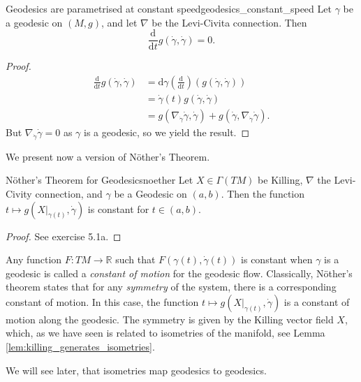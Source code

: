 \begin{colorlem}{Geodesics are parametrised at constant speed}{geodesics_constant_speed}
Let $\gamma$ be a geodesic on $(M,g)$, and let $\nabla$ be the Levi-Civita connection. Then 
$$\frac{\mathrm{d}}{\mathrm{d}t} g(\dot\gamma,\dot\gamma)=0.$$
\end{colorlem}
\begin{proof}
    \begin{align*}
        \frac{\mathrm{d}}{\mathrm{d}t} g(\dot\gamma,\dot\gamma)
        &= \mathrm{d} \gamma \left ( \frac{\mathrm{d}}{\mathrm{d}t} \right ) \left ( g(\dot\gamma,\dot\gamma) \right )\\
        &= \dot\gamma(t) g(\dot\gamma,\dot\gamma)\\
        &= g(\nabla_{\dot\gamma}\dot\gamma,\dot\gamma) + g(\dot\gamma,\nabla_{\dot\gamma}\dot\gamma). 
    \end{align*}
    But $\nabla_{\dot\gamma}\dot\gamma=0$ as $\gamma$ is a geodesic, so we yield the result.
\end{proof}



We present now a version of Nöther's Theorem.

\begin{colorlem}{Nöther's Theorem for Geodesics}{noether}
Let $X \in \Gamma(TM)$ be Killing, $\nabla$ the Levi-Civity connection, and $\gamma$ be a Geodesic on $(a,b)$. Then the function $t \mapsto g(X|_{\gamma(t)}, \dot{\gamma})$ is constant for $t \in (a, b)$.
\end{colorlem}

\begin{proof}
See exercise 5.1a.
\end{proof}

Any function $F: TM \to \mathbb{R}$ such that $F(\gamma(t), \dot{\gamma}(t))$ is constant when $\gamma$ is a geodesic is called a \emph{constant of motion} for the geodesic flow. Classically, Nöther's theorem states that for any \emph{symmetry} of the system, there is a corresponding constant of motion. In this case, the function $t \mapsto g(X|_{\gamma(t)}, \dot{\gamma})$ is a constant of motion along the geodesic. The symmetry is given by the Killing vector field $X$, which, as we have seen is related to isometries of the manifold, see Lemma \ref{lem:killing_generates_isometries}.

We will see later, that isometries map geodesics to geodesics.



